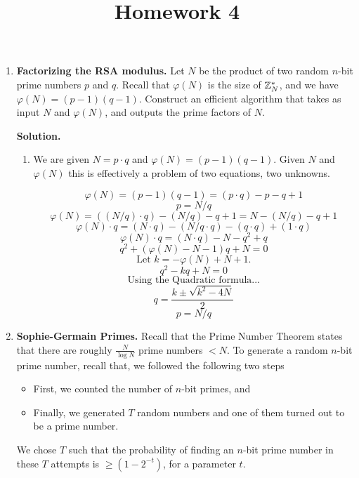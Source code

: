 \documentclass[11pt]{article}
\newcommand{\nextoddpage}{\checkoddpage\ifoddpage{\ \newpage\ \newpage}\else{\ \newpage}\fi}
\begin{document}
\title{Homework 4}

\date{}

\maketitle 

\thispagestyle{fancy}  
\pagestyle{fancy}      




\begin{enumerate}

\item {\bfseries Factorizing the RSA modulus.} 
  Let $N$ be the product of two random $n$-bit prime numbers $p$ and $q$. 
  Recall that $\varphi(N)$ is the size of ${\mathbb Z}_N^*$, and we have $\varphi(N)=(p-1)(q-1)$. 
  Construct an efficient algorithm that takes as input $N$ and $\varphi(N)$, and outputs the prime factors of  $N$. 
  
  {\bfseries Solution.} 
  \begin{enumerate}
  \item We are given $N = p \cdot q$ and $\varphi(N)=(p-1)(q-1)$. Given $N$ and $\varphi(N)$ this is effectively a problem of two equations, two unknowns.
  \begin{boxedalgo}
  $$\varphi(N) = (p-1)(q-1) = (p \cdot q) - p - q + 1$$
  $$p = N / q$$
  $$\varphi(N) = ((N / q) \cdot q) - (N / q) - q + 1 = N - (N / q) - q + 1$$
  $$\varphi(N) \cdot q = (N \cdot q) - (N / q \cdot q) - (q \cdot q) + (1 \cdot q)$$
  $$\varphi(N) \cdot q = (N \cdot q) - N - q^2 + q$$
  $$q^2+(\varphi(N)-N-1)q+N=0$$
  $$\text{Let }k = -\varphi(N)+N+1.$$
  $$q^2-kq+N=0$$
  $$\text{Using the Quadratic formula...}$$
  $$q = \frac{k\pm \sqrt{k^2-4N}}{2}$$
  $$p = N / q$$
  \end{boxedalgo} 
  \end{enumerate}  


  
\nextoddpage 
\item {\bfseries Sophie-Germain Primes.}
  Recall that the Prime Number Theorem states that there are roughly $\frac N{\log N}$ prime numbers $<N$. 
  To generate a random $n$-bit prime number, recall that, we followed the following two steps
  \begin{itemize}
  \item First, we counted the number of $n$-bit primes, and 
  \item Finally, we generated $T$ random numbers and one of them turned out to be a prime number.
  \end{itemize}  
  We chose $T$ such that the probability of finding an $n$-bit prime number in these $T$ attempts is $\geq (1-2^{-t})$, for a parameter $t$. 
  

\end{enumerate}
\end{document}
